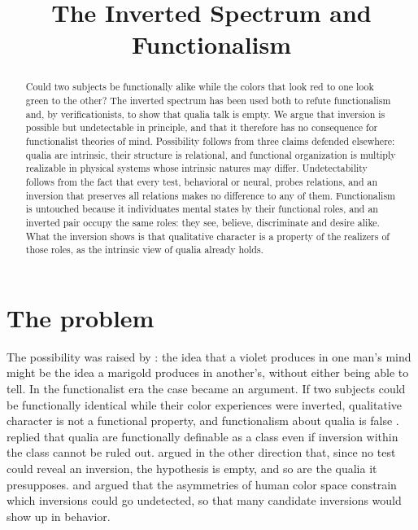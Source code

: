 \documentclass{situationist-preprint}
\title{The Inverted Spectrum and Functionalism}
\begin{document}
\maketitle

\begin{abstract}
Could two subjects be functionally alike while the colors that look red to one look green to the other? The inverted spectrum has been used both to refute functionalism and, by verificationists, to show that qualia talk is empty. We argue that inversion is possible but undetectable in principle, and that it therefore has no consequence for functionalist theories of mind. Possibility follows from three claims defended elsewhere: qualia are intrinsic, their structure is relational, and functional organization is multiply realizable in physical systems whose intrinsic natures may differ. Undetectability follows from the fact that every test, behavioral or neural, probes relations, and an inversion that preserves all relations makes no difference to any of them. Functionalism is untouched because it individuates mental states by their functional roles, and an inverted pair occupy the same roles: they see, believe, discriminate and desire alike. What the inversion shows is that qualitative character is a property of the realizers of those roles, as the intrinsic view of qualia already holds.
\end{abstract}

\section{The problem}

The possibility was raised by \citet[II.xxxii.15]{Locke1690}: the idea that a violet produces in one man's mind might be the idea a marigold produces in another's, without either being able to tell. In the functionalist era the case became an argument. If two subjects could be functionally identical while their color experiences were inverted, qualitative character is not a functional property, and functionalism about qualia is false \citep{Block1990}. \citet{Shoemaker1982} replied that qualia are functionally definable as a class even if inversion within the class cannot be ruled out. \citet{Dennett1988} argued in the other direction that, since no test could reveal an inversion, the hypothesis is empty, and so are the qualia it presupposes. \citet{Hardin1988} and \citet{Palmer1999} argued that the asymmetries of human color space constrain which inversions could go undetected, so that many candidate inversions would show up in behavior.
\end{document}
